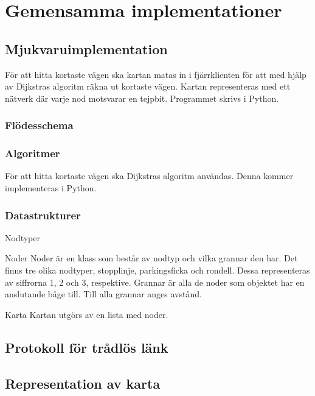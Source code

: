 \documentclass[designspec/spec.tex]{subfiles}
\begin{document}
\section{Gemensamma implementationer}

\subsection{Mjukvaruimplementation}
För att hitta kortaste vägen ska kartan matas in i fjärrklienten för att med
hjälp av Dijkstras algoritm räkna ut kortaste vägen. Kartan
representeras med ett nätverk där varje nod motsvarar en tejpbit. Programmet
skrivs i Python.

\subsubsection{Flödesschema}

\subsubsection{Algoritmer}
För att hitta kortaste vägen ska Dijkstras algoritm användas. Denna kommer
implementeras i Python.

\subsubsection{Datastrukturer}

\begin{labeling}{Nodtyper}

\item [Noder] 
Noder är en klass som består av nodtyp och vilka grannar den har.
Det finns tre olika nodtyper, stopplinje, parkingsficka och rondell. Dessa
representeras av siffrorna 1, 2 och 3, respektive.
Grannar är alla de noder som objektet har en anslutande båge till. Till alla
grannar anges avstånd.

\item[Karta]
Kartan utgörs av en lista med noder. 

\end{labeling}


\subsection{Protokoll för trådlös länk}

\subsection{Representation av karta}
\end{document}
